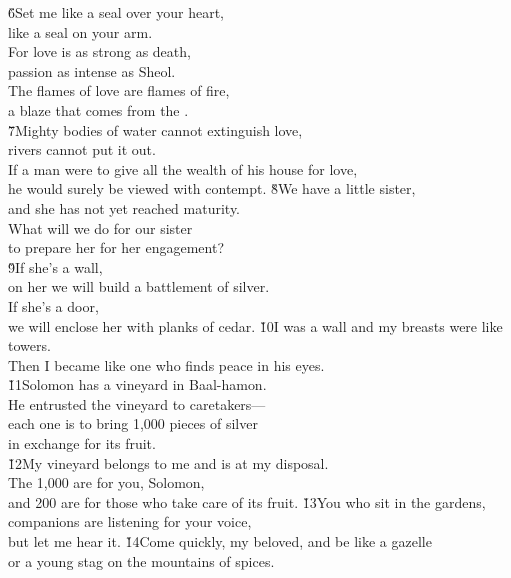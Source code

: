 \begin{poetry}
\poeml \v{6}Set me like a seal over your heart, \\
\poemll    like a seal on your arm. \\
\poeml For love is as strong as death, \\
\poemll    passion as intense as Sheol. \\
\poeml The flames of love are flames of fire, \\
\poemll    a blaze that comes from the . \\
\poeml \v{7}Mighty bodies of water cannot extinguish love, \\
\poemll    rivers cannot put it out. \\
\poeml If a man were to give all the wealth of his house for love, \\
\poemll    he would surely be viewed with contempt.
\poeml \v{8}We have a little sister, \\
\poemll    and she has not yet reached maturity. \\
\poeml What will we do for our sister \\
\poemll    to prepare her for her engagement? \\
\poeml \v{9}If she's a wall, \\
\poemll    on her we will build a battlement of silver. \\
\poeml If she's a door, \\
\poemll    we will enclose her with planks of cedar.
\poeml \v{10}I was a wall and my breasts were like towers. \\
\poemll    Then I became like one who finds peace in his eyes. \\
\poeml \v{11}Solomon has a vineyard in Baal-hamon. \\
\poemll    He entrusted the vineyard to caretakers--- \\
\poeml each one is to bring 1,000 pieces of silver \\
\poemll    in exchange for its fruit. \\
\poeml \v{12}My vineyard belongs to me and is at my disposal. \\
\poemll    The 1,000 are for you, Solomon, \\
\poemlll       and 200 are for those who take care of its fruit.
\poeml \v{13}You who sit in the gardens, \\
\poemll    companions are listening for your voice, \\
\poemlll       but let me hear it.
\poeml \v{14}Come quickly, my beloved, and be like a gazelle \\
\poemll    or a young stag on the mountains of spices.\end{poetry}
